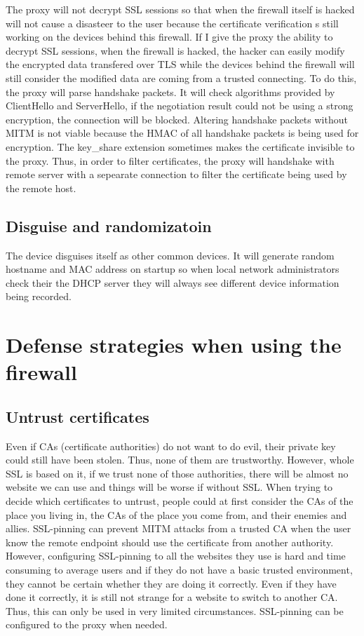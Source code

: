\documentclass[mscthesis]{usiinfthesis}
\begin{document}
The proxy will not decrypt SSL sessions so that when the firewall itself is hacked will not cause a disasteer to the user because the certificate verification s still working on the devices behind this firewall. If I give the proxy the ability to decrypt SSL sessions, when the firewall is hacked, the hacker can easily modify the encrypted data transfered over TLS while the devices behind the firewall will still consider the modified data are coming from a trusted connecting. To do this, the proxy will parse handshake packets. It will check algorithms provided by ClientHello and ServerHello, if the negotiation result could not be using a strong encryption, the connection will be blocked. Altering handshake packets without MITM is not viable because the HMAC of all handshake packets is being used for encryption. The key_share extension sometimes makes the certificate invisible to the proxy. Thus, in order to filter certificates, the proxy will handshake with remote server with a sepearate connection to filter the certificate being used by the remote host.\par


\section{Disguise and randomizatoin}

The device disguises itself as other common devices. It will generate random hostname and MAC address on startup so when local network administrators check their the DHCP server they will always see different device information being recorded.

\chapter{Defense strategies when using the firewall}

\section{Untrust certificates}

Even if CAs (certificate authorities) do not want to do evil, their private key could still have been stolen. Thus, none of them are trustworthy. However, whole SSL is based on it, if we trust none of those authorities, there will be almost no website we can use and things will be worse if without SSL. When trying to decide which certificates to untrust, people could at first consider the CAs of the place you living in, the CAs of the place you come from, and their enemies and allies. SSL-pinning can prevent MITM attacks from a trusted CA when the user know the remote endpoint should use the certificate from another authority. However, configuring SSL-pinning to all the websites they use is hard and time consuming to average users and if they do not have a basic trusted environment, they cannot be certain whether they are doing it correctly. Even if they have done it correctly, it is still not strange for a website to switch to another CA. Thus, this can only be used in very limited circumstances. SSL-pinning can be configured to the proxy when needed.
\end{document}

